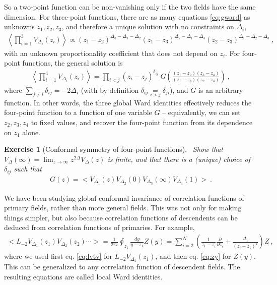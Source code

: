\documentclass[12pt, a4paper]{article}
\theoremstyle{break}
\newtheorem{exo}{Exercise}[section]
\begin{document}
So a two-point function can be non-vanishing only if the two fields have the same dimension.
For three-point functions, there are as many equations \eqref{eq:gward} as unknowns $z_1,z_2,z_3$, and therefore a unique solution with no constraints on $\Delta_i$,
\begin{align}
 \left< \prod_{i=1}^3 V_{\Delta_i}(z_i) \right> \propto (z_1-z_2)^{\Delta_3-\Delta_1-\Delta_2} (z_1-z_3)^{\Delta_2-\Delta_1-\Delta_3} (z_2-z_3)^{\Delta_1-\Delta_2-\Delta_3}\ ,
 \label{eq:3pt}
\end{align}
with an unknown proportionality coefficient that does not depend on $z_i$.
For four-point functions, the general solution is
\begin{align}
 \left< \prod_{i=1}^4 V_{\Delta_i}(z_i) \right> = \prod_{i<j}(z_i-z_j)^{\delta_{ij}}\ G\left(\frac{(z_1-z_2)(z_3-z_4)}{(z_1-z_3)(z_2-z_4)}\right)\ ,
\end{align}
where $\sum_{j\neq i} \delta_{ij} = -2\Delta_i$ (with by definition $\delta_{ij}\underset{i>j}{=}\delta_{ji}$), and $G$ is an arbitrary function.
In other words, the three global Ward identities effectively reduces the four-point function to a function of one variable $G$ -- equivalently, we can set $z_2,z_3,z_4$ to fixed values, and recover the four-point function from its dependence on $z_1$ alone. 

\begin{exo}[Conformal symmetry of four-point functions]
~\label{exo:4pt}
 Show that $V_\Delta(\infty) = \lim_{z\to\infty} z^{2\Delta}V_\Delta(z) $ is finite, and that there is a (unique) choice of $\delta_{ij}$ such that 
 \begin{align}
  G(z) = \Big< V_{\Delta_1}(z) V_{\Delta_2}(0)V_{\Delta_3}(\infty)V_{\Delta_4}(1) \Big>\ .
 \end{align}
\end{exo}

We have been studying global conformal invariance of correlation functions of primary fields, rather than more general fields. This was not only for making things simpler, but also because correlation functions of descendents can be deduced from correlation functions of primaries. For example,
\begin{align}
 \Big< L_{-2}V_{\Delta_1}(z_1) V_{\Delta_2}(z_2)\cdots \Big>
  = \frac{1}{2\pi i}\oint_{z_1} \frac{dy}{y-z_1} Z(y)
  =\sum_{i=2}^N\left(\frac{1}{z_1-z_i}\frac{\partial}{\partial z_i} +\frac{\Delta_i}{(z_i-z_1)^2}\right) Z\ ,
  \label{eq:ltv}
\end{align}
where we used first eq. \eqref{eq:lvtv} for $L_{-2}V_{\Delta_1}(z_1)$, and then eq. \eqref{eq:zy} for $Z(y)$.
This can be generalized to any correlation function of descendent fields. The resulting equations are called local Ward identities.
\end{document}
